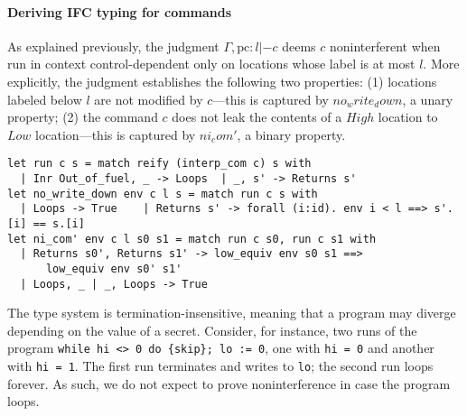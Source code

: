 \documentclass[sigplan,screen]{acmart}\settopmatter{}
\newcommand{\comm}[3]{\ifcheckpagebudget\else\ifdraft{\maybecolor{#1}[#2: #3]}\fi\fi}
\newcommand{\nik}[1]{\comm{dkpurple}{Nik}{#1}}
\newcommand{\ch}[1]{\comm{teal}{CH}{#1}}
\newcommand{\nig}[1]{\comm{dkgreen}{Niklas}{#1}}
\newcommand*{\EG}{e.g.,\xspace}
\begin{document}
\paragraph*{Deriving IFC typing for commands} As explained previously, the
judgment $\Gamma, \text{pc}:l |- c$ deems $c$ noninterferent when run
in context control-dependent only on locations whose label is at most
$l$. More explicitly, the judgment establishes the following two
properties:
(1) locations labeled below $l$ are not modified by $c$---this is
  captured by \ls$no_write_down$, a unary property;
(2) the command $c$ does not leak the contents of a \ls$High$ location to \ls$Low$
  location---this is captured by \ls$ni_com'$, a binary property.



\begin{lstlisting}
let run c s = match reify (interp_com c) s with
  | Inr Out_of_fuel, _ -> Loops  | _, s' -> Returns s'
let no_write_down env c l s = match run c s with
  | Loops -> True    | Returns s' -> forall (i:id). env i < l ==> s'.[i] == s.[i]
let ni_com' env c l s0 s1 = match run c s0, run c s1 with
  | Returns s0', Returns s1' -> low_equiv env s0 s1 ==> 
      low_equiv env s0' s1'
  | Loops, _ | _, Loops -> True
\end{lstlisting}

The type system is termination-insensitive,
meaning that a program may diverge depending on the value of a
secret. Consider, for instance, two runs of the program
\texttt{while hi <> 0 do \{skip\}; lo := 0}, one with \texttt{hi = 0}
and another with \texttt{hi = 1}. The first run terminates and writes
to \texttt{lo}; the second run loops forever. As such, we do not
expect to prove noninterference in case the program loops.
\iffull
\end{document}
